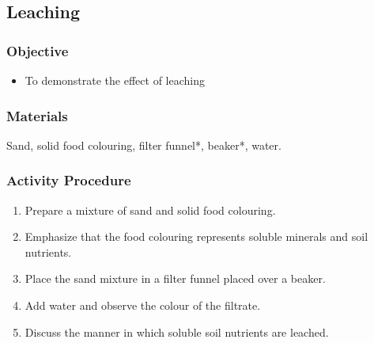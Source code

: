 \subsection{Leaching}

\subsubsection{Objective}
\begin{itemize}
\item{To demonstrate the effect of leaching}
\end{itemize}

\subsubsection{Materials}
Sand, solid food colouring, filter funnel*, beaker*, water.

\subsubsection{Activity Procedure}
\begin{enumerate}
\item{Prepare a mixture of sand and solid food colouring.}
\item{Emphasize that the food colouring represents soluble minerals and soil nutrients.}
\item{Place the sand mixture in a filter funnel placed over a beaker.}
\item{Add water and observe the colour of the filtrate.}
\item{Discuss the manner in which soluble soil nutrients are leached.}
\end{enumerate}